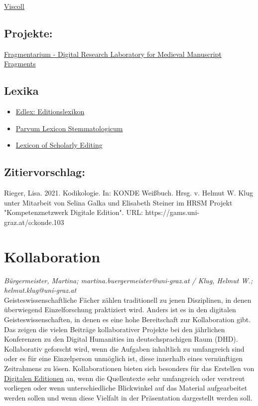 \documentclass{article}
\begin{document}
\href{https://github.com/leoba/VisColl}{Viscoll}\subsection*{Projekte:}\href{https://www.fragmentarium.ms}{Fragmentarium - Digital Research Laboratory for Medieval Manuscript Fragments}\subsection*{Lexika}\begin{itemize}\item \href{https://edlex.de/index.php?title=Kodikologie}{Edlex: Editionslexikon}\item \href{https://wiki.helsinki.fi/display/stemmatology/Codicology}{Parvum Lexicon Stemmatologicum}\item \href{https://lexiconse.uantwerpen.be/index.php/lexicon/codicology/}{Lexicon of Scholarly Editing}\end{itemize}\subsection*{Zitiervorschlag:}Rieger, Lisa. 2021. Kodikologie. In: KONDE Weißbuch. Hrsg. v. Helmut W. Klug unter Mitarbeit von Selina Galka und Elisabeth Steiner im HRSM Projekt "Kompetenznetzwerk Digitale Edition". URL: https://gams.uni-graz.at/o:konde.103\newpage\section*{Kollaboration} \emph{Bürgermeister, Martina; martina.buergermeister@uni-graz.at / Klug, Helmut W.; helmut.klug@uni-graz.at }\\
        
    Geisteswissenschaftliche Fächer zählen traditionell zu jenen Disziplinen, in denen überwiegend Einzelforschung praktiziert wird. Anders ist es in den digitalen Geisteswissenschaften, in denen es eine hohe Bereitschaft zur Kollaboration gibt. Das zeigen die vielen Beiträge kollaborativer Projekte bei den jährlichen Konferenzen zu den Digital Humanities im deutschsprachigen Raum (DHD). Kollaborativ geforscht wird, wenn die Aufgaben inhaltlich zu umfangreich sind oder es für eine Einzelperson unmöglich ist, diese innerhalb eines vernünftigen Zeitrahmens zu lösen. Kollaborationen bieten sich besonders für das Erstellen von \href{http://gams.uni-graz.at/o:konde.59}{Digitalen Editionen} an, wenn die Quellentexte sehr umfangreich oder verstreut vorliegen oder wenn unterschiedliche Blickwinkel auf das Material aufgearbeitet werden sollen und wenn diese Vielfalt in der Präsentation dargestellt werden soll.\\
            
\end{document}
